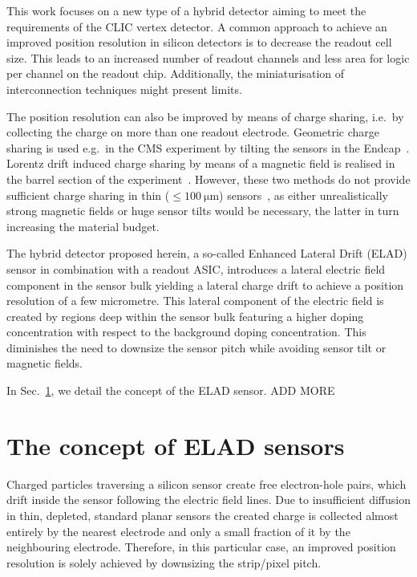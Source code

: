 \documentclass[preprint]{elsarticle}
\begin{document}
This work focuses on a new type of a hybrid detector aiming to meet the requirements of the CLIC vertex detector.
A common approach to achieve an improved position resolution in silicon detectors is to decrease the readout cell size.
This leads to an increased number of readout channels and less area for logic per channel on the readout chip.
Additionally, the miniaturisation of interconnection techniques might present limits. 

The position resolution can also be improved by means of charge sharing, i.e.\ by collecting the charge on more than one readout electrode.
Geometric charge sharing is used e.g.\ in the CMS experiment by tilting the sensors in the Endcap~\cite{simon}. 
Lorentz drift induced charge sharing by means of a magnetic field is realised in the barrel section of the experiment~\cite{cmstdr}.
However, these two methods do not provide sufficient charge sharing in thin ($\leq \SI{100}{\um}$) sensors~\cite{clicyellowreport},
 as either unrealistically strong magnetic fields or huge sensor tilts would be necessary, the latter in turn increasing the material budget.

The hybrid detector proposed herein, a so-called Enhanced Lateral Drift (ELAD) sensor in combination with a readout ASIC,
 introduces a lateral electric field component in the sensor bulk yielding a lateral charge drift to achieve a position resolution of a few micrometre. 
This lateral component of the electric field is created by regions deep within the sensor bulk featuring a higher doping concentration with respect to the background doping concentration.
This diminishes the need to downsize the sensor pitch while avoiding sensor tilt or magnetic fields. 

In Sec.~\ref{sec:con}, we detail the concept of the ELAD sensor.
ADD MORE


\section{The concept of ELAD sensors}
\label{sec:con}
Charged particles traversing a silicon sensor create free electron-hole pairs, which drift inside the sensor following the electric field lines.
Due to insufficient diffusion in thin, depleted, standard planar sensors the created charge is collected almost entirely by the nearest electrode and only a small fraction of it by the neighbouring electrode.
Therefore, in this particular case, an improved position resolution is solely achieved by downsizing the strip/pixel pitch.
\end{document}
